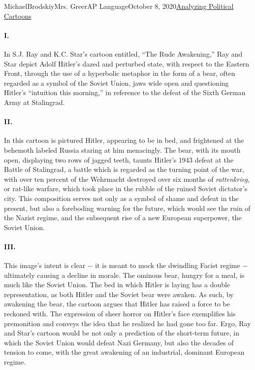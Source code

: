 \documentclass[12pt,letterpaper]{article}
\begin{document}
\begin{mla}{Michael}{Brodskiy}{Mrs. Greer}{AP Language}{October 8, 2020}{\underline{Analyzing Political Cartoons}} 

  \begin{justifying}

    \paragraph{I.} In S.J. Ray and K.C. Star's cartoon entitled, ``The Rude Awakening,'' Ray and Star depict Adolf Hitler's dazed and perturbed state, with respect to the Eastern Front, through the use of a hyperbolic metaphor in the form of a bear, often regarded as a symbol of the Soviet Union, jaws wide open and questioning Hitler's ``intuition this morning,'' in reference to the defeat of the Sixth German Army at Stalingrad.
    \paragraph{II.} In this cartoon is pictured Hitler, appearing to be in bed, and frightened at the behemoth labeled Russia staring at him menacingly. The bear, with its mouth open, displaying two rows of jagged teeth, taunts Hitler's 1943 defeat at the Battle of Stalingrad, a battle which is regarded as the turning point of the war, with over ten percent of the Wehrmacht destroyed over six months of \textit{rattenkrieg}, or rat-like warfare, which took place in the rubble of the ruined Soviet dictator's city. This composition serves not only as a symbol of shame and defeat in the present, but also a foreboding warning for the future, which would see the ruin of the Nazist regime, and the subsequent rise of a new European superpower, the Soviet Union.
    \paragraph{III.} This image's intent is clear $-$ it is meant to mock the dwindling Facist regime $-$ ultimately causing a decline in morale. The ominous bear, hungry for a meal, is much like the Soviet Union. The bed in which Hitler is laying has a double representation, as both Hitler and the Soviet bear were awaken. As such, by awakening the bear, the cartoon argues that Hitler has raised a force to be reckoned with. The expression of sheer horror on Hitler's face exemplifies his premonition and conveys the idea that he realized he had gone too far. Ergo, Ray and Star's cartoon would be not only a prediction of the short-term future, in which the Soviet Union would defeat Nazi Germany, but also the decades of tension to come, with the great awakening of an industrial, dominant European regime.



\end{justifying}
\end{mla}
\end{document}
